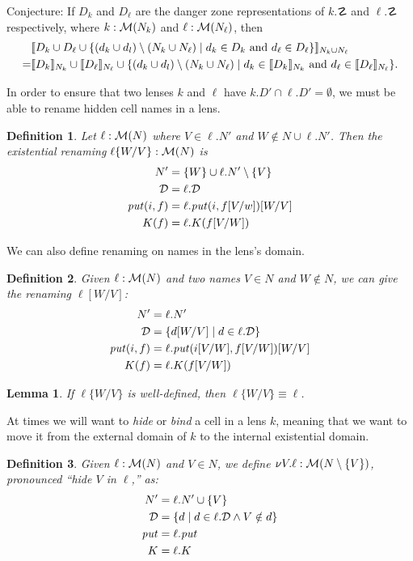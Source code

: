 \documentclass{article}
\newtheorem{lemma}{Lemma}
\newtheorem{definition}{Definition}
\begin{document}
Conjecture: If $D_k$ and $D_\ell$ are the danger zone representations of 
    $k.\danger$ and $\ell.\danger$ respectively, where
    $k:\mathcal M(N_k)$ and $\ell:\mathcal M(N_\ell)$, then 
    \begin{align*}
        &\llbracket D_k \cup D_\ell \cup \{(d_k \cup d_l) \setminus (N_k \cup N_\ell) \mid d_k \in D_k \text{ and } d_\ell \in D_\ell\} \rrbracket_{N_k \cup N_\ell} \\
        = &\llbracket D_k \rrbracket_{N_k} \cup \llbracket D_\ell \rrbracket_{N_\ell} \cup 
        \{(d_k \cup d_l) \setminus (N_k \cup N_\ell) \mid d_k \in \llbracket D_k \rrbracket_{N_k} 
                                           \text{ and } d_\ell \in \llbracket D_\ell \rrbracket_{N_\ell}\}.
    \end{align*}

In order to ensure that two lenses $k$ and $\ell$ have $k.D' \cap \ell.D' = \emptyset$,
we must be able to rename hidden cell names in a lens.
\begin{definition}
    Let $\ell : \mathcal M(N)$ where $V \in \ell.N'$ and $W \notin N \cup \ell.N'$. 
    Then the existential renaming $\ell\{W/V\} : \mathcal M(N)$ is
    \begin{align*}
        N' &= \{W\} \cup \ell.N' \setminus \{V\} \\
        \mathcal D &= \ell.\mathcal D \\
        \mathit{put}(i,f) &= \ell.\mathit{put}(i,f[V/w])[W/V] \\
        K(f) &= \ell.K(f[V/W])
    \end{align*}
\end{definition}
We can also define renaming on names in the lens's domain.
\begin{definition}
    Given $\ell : \mathcal M(N)$ and two names $V \in N$ and $W \notin N$, we can
    give the renaming $\ell[W/V]$:
    \begin{align*}
        N' &= \ell.N' \\
        \mathcal D &= \{d[W/V] \mid d \in \ell.\mathcal D\} \\
        \mathit{put}(i,f) &= \ell.\mathit{put}(i[V/W], f[V/W])[W/V] \\
        K(f) &= \ell.K(f[V/W])
    \end{align*}
\end{definition}
\begin{lemma}
    If $\ell\{W/V\}$ is well-defined, then $\ell\{W/V\} \equiv \ell$.
\end{lemma}

At times we will want to \emph{hide} or \emph{bind} a cell in a lens $k$, 
meaning that we want to move it from the external domain of $k$ to the
internal existential domain.
\begin{definition}
    Given $\ell : \mathcal M(N)$ and $V \in N$, we define $\nu V.\ell : \mathcal M(N
    \setminus \{V\})$, pronounced ``hide $V$ in $\ell$,'' as:
    \begin{align*}
        N' &= \ell.N' \cup \{V\} \\
        \mathcal D &= \{d \mid d \in \ell.\mathcal D \land V \notin d\} \\
        \mathit{put} &= \ell.\mathit{put} \\
        K &= \ell.K
    \end{align*}
\end{definition}
\end{document}
